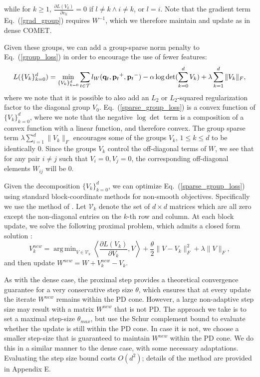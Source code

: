 \documentclass[twoside,11pt]{article}
\newcommand\mat[1]{{#1}}
\renewcommand\vec[1]{\mathbf{#1}}
\newcommand{\W}{\mat{W}}
\newcommand{\q}{{\vec{q}}}
\newcommand{\p}{{\vec{p}}}
\newcommand{\trip}{{t}}
\newcommand{\qt}{{\q_{\trip}}}
\newcommand{\pt}{{\p_{\trip}}}
\newcommand{\Vk}{\mat{V_k}}
\newcommand{\Vg}{\{\Vk\}_{k=0}^{d}} %
\renewcommand{\eqref}[1]{Eq.~(\ref{#1})}
\DeclareMathOperator*{\argmin}{arg\,min}
\begin{document}
while for $k \geq 1$, $\frac{\partial {L (V_k)}}{\partial v_{li}}=0$ if  $l \neq k \wedge i \neq k$, or $l=i$. Note that the gradient term \eqref{grad_group} requires $\W^{-1}$, which we therefore maintain and update as in dense COMET.

Given these groups, we can add a group-sparse norm penalty to \eqref{group_loss} in order to encourage the use of fewer features:
\begin{equation}
L(\Vg) = 
  \min_{\Vg} \sum_{\trip \in \cal{T}}   l_{\W}(\qt, \pt^+, \pt^-) - \alpha \log \det(\sum_{k=0}^{d}{\Vk}) + \lambda \sum_{k=1}^d \|V_k\|_F,
  \label{sparse_group_loss}
\end{equation} 
where we note that it is possible to also add an $L_2$ or $L_2$-squared regularization factor to the diagonal group $V_0$. \eqref{sparse_group_loss} is a convex function of $\Vg$, where we note that the negative $\log \det$ term is a composition of a convex function with a linear function, and therefore convex.
The group sparse term $\lambda \sum_{i=1}^d \|V_k\|_F$ encourages some of the groups $V_k$, $1\leq k \leq d$ to be identically $0$. Since the groups $V_k$ control the off-diagonal terms of $W$, we see that for any pair $i\neq j$ such that $V_i=0, V_j=0$, the corresponding off-diagonal elements $W_{ij}$ will be $0$. 

Given the decomposition $\Vg$, we can optimize \eqref{sparse_group_loss} using standard block-coordinate methods for non-smooth objectives. Specifically we use the method of \citet{richtarik2014iteration}. Let $\mathcal{V}_k$ denote the set of $d \times d$ matrices which are all zero except the non-diagonal entries on the $k$-th row and column. At each block update, we solve the following proximal problem, which admits a closed form solution \citep{bach2012optimization}:
\begin{equation}\label{eq:prox}
V_k^{new} = \argmin_{\mat{V} \in \mathcal{V}_k} \left\langle \frac{\partial{L (V_k)}}{\partial V_k}, \mat{V} \right\rangle + \frac{\theta}{2}\|V - V_k\|_F^2 + \lambda \|V\|_F,
\end{equation}
and then update $\W^{new} = \W + V_k^{new} - V_k$.

As with the dense case, the proximal step provides a theoretical convergence guarantee for a very conservative step size $\theta$, which ensures that at every update the iterate $\W^{new}$ remains within the PD cone.
However, a large non-adaptive step size may result with a matrix $\W^{new}$ that is not PD. The approach we take is to set a maximal step-size $\theta_{max}$, but use the Schur complement bound to evaluate whether the update is still within the PD cone. In case it is not, we choose a smaller step-size that is guaranteed to maintain $W^{new}$ within the PD cone. We do this in a similar manner to the dense case, with some necessary adaptations. Evaluating the step size bound costs $O(d^2)$; details of the method are provided in Appendix E. 
\end{document}
